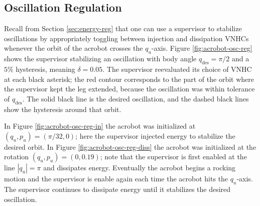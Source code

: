 \documentclass[journal,twoside,web, twocolumn,draftcls]{ieeecolor}
\begin{document}
\subsection{Oscillation Regulation}

Recall from Section \ref{sec:energy-reg} that one can use a supervisor to stabilize
oscillations by appropriately toggling between injection and dissipation VNHCs
whenever the orbit of the acrobot crosses the \(q_u\)-axis.
Figure \ref{fig:acrobot-osc-reg} shows the supervisor stabilizing an
oscillation with body angle \(q_\text{des} = \pi/2\) and a 
\(5\%\) hysteresis, meaning \(\delta = 0.05\).
The supervisor reevaluated its choice of VNHC at each black asterisk;  
the red contour corresponds to the part of the orbit where the supervisor kept
the leg extended, because the oscillation was within tolerance of
\(q_\text{des}\).
The solid black line is the desired oscillation, and the dashed black
lines show the hysteresis around that orbit.

In Figure \ref{fig:acrobot-osc-reg-in} the acrobot was initialized at 
\((q_u,p_u) = (\pi/32,0)\); here the supervisor injected energy to stabilize the
desired orbit.
In Figure \ref{fig:acrobot-osc-reg-diss} the acrobot was initialized at the rotation
\((q_u,p_u) = (0,0.19)\); note that the supervisor is first enabled at the line
\(|q_u| = \pi\) and dissipates energy. Eventually the acrobot begins a rocking
motion and the supervisor is enable again each time the acrobot hits the
\(q_u\)-axis. 
The supervisor continues to dissipate energy until it stabilizes the desired
oscillation.
\end{document}
